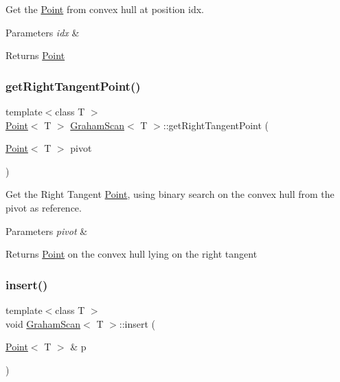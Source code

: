 Get the \mbox{\hyperlink{classPoint}{Point}} from convex hull at position \textquotesingle{}idx\textquotesingle{}. 


\begin{DoxyParams}{Parameters}
{\em idx} & \\
\hline
\end{DoxyParams}
\begin{DoxyReturn}{Returns}
\mbox{\hyperlink{classPoint}{Point}} 
\end{DoxyReturn}
\mbox{\label{classGrahamScan_af47ec86625b2f4f32752c92ef29fbcbd}} 
\subsubsection{\texorpdfstring{get\+Right\+Tangent\+Point()}{getRightTangentPoint()}}
{\footnotesize\ttfamily template$<$class T $>$ \\
\mbox{\hyperlink{classPoint}{Point}}$<$ T $>$ \mbox{\hyperlink{classGrahamScan}{Graham\+Scan}}$<$ T $>$\+::get\+Right\+Tangent\+Point (\begin{DoxyParamCaption}\item[{\mbox{\hyperlink{classPoint}{Point}}$<$ T $>$}]{pivot }\end{DoxyParamCaption})}



Get the Right Tangent \mbox{\hyperlink{classPoint}{Point}}, using binary search on the convex hull from the pivot as reference. 


\begin{DoxyParams}{Parameters}
{\em pivot} & \\
\hline
\end{DoxyParams}
\begin{DoxyReturn}{Returns}
\mbox{\hyperlink{classPoint}{Point}} on the convex hull lying on the right tangent 
\end{DoxyReturn}
\mbox{\label{classGrahamScan_a942f7d7c58a6992600b6adda70e5e14d}} 
\subsubsection{\texorpdfstring{insert()}{insert()}}
{\footnotesize\ttfamily template$<$class T $>$ \\
void \mbox{\hyperlink{classGrahamScan}{Graham\+Scan}}$<$ T $>$\+::insert (\begin{DoxyParamCaption}\item[{\mbox{\hyperlink{classPoint}{Point}}$<$ T $>$ \&}]{p }\end{DoxyParamCaption})\hspace{0.3cm}{\ttfamily [private]}}



